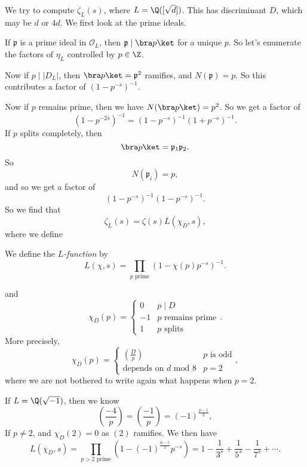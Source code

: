 \documentclass[a4paper]{article}
\begin{document}
\begin{eg}
  We try to compute $\zeta_L(s)$, where $L = \Q([\sqrt{d}])$. This has discriminant $D$, which may be $d$ or $4d$. We first look at the prime ideals.

  If $\mathfrak{p}$ is a prime ideal in $\mathcal{O}_L$, then $\mathfrak{p} \mid \bra p\ket$ for a unique $p$. So let's enumerate the factors of $\eta_L$ controlled by $p \in \Z$.

  Now if $p \mid |D_L|$, then $\bra p\ket = \mathfrak{p}^2$ ramifies, and $N(\mathfrak{p}) = p$. So this contributes a factor of $(1 - p^{-s})^{-1}$.

  Now if $p$ remains prime, then we have $N(\bra p\ket) = p^2$. So we get a factor of
  \[
    (1 - p^{-2s})^{-1} = (1 - p^{-s})^{-1} (1 + p^{-s})^{-1}.
  \]
  If $p$ splits completely, then
  \[
    \bra p\ket = \mathfrak{p}_1 \mathfrak{p}_2.
  \]
  So \[
    N(\mathfrak{p}_i) = p,
  \]
  and so we get a factor of
  \[
    (1 - p^{-s})^{-1}(1 - p^{-s})^{-1}.
  \]
  So we find that
  \[
    \zeta_L(s) = \zeta(s) L(\chi_D, s),
  \]
  where we define
  \begin{defi}[$L$-function]
    We define the \emph{$L$-function} by
    \[
      L(\chi, s) = \prod_{p\text{ prime}} (1 - \chi(p)p^{-s})^{-1}.
    \]
  \end{defi}
  and
  \[
    \chi_D(p) =
    \begin{cases}
      0 & p \mid D\\
      -1 & p\text{ remains prime}\\
      1 & p\text{ splits}
    \end{cases}.
  \]
  More precisely,
  \[
    \chi_D(p) =
    \begin{cases}
      \left(\frac{D}{p}\right) & p\text{ is odd}\\
      \text{depends on }d \text{ mod } 8 & p = 2
    \end{cases},
  \]
  where we are not bothered to write again what happens when $p = 2$.
\end{eg}

\begin{eg}
  If $L = \Q(\sqrt{-1})$, then we know
  \[
    \left(\frac{-4}{p}\right) = \left(\frac{-1}{p}\right) = (-1)^{\frac{p - 1}{2}},
  \]
  If $p \not= 2$, and $\chi_D(2) = 0$ as $(2)$ ramifies. We then have
  \[
    L(\chi_D, s) = \prod_{p > 2\text{ prime}} (1 - (-1)^{\frac{p - 1}{2}}p^{-s}) = 1 - \frac{1}{3^s} + \frac{1}{5^s} - \frac{1}{7^s} + \cdots.
  \]
\end{eg}
\end{document}
